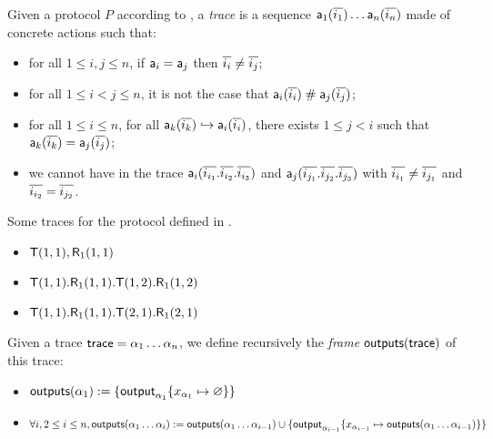 \begin{definition}
  Given a protocol $P$ according to , a \emph{trace} is a sequence $\textsf{a}_1(\overline{i_1}) \dots \textsf{a}_n(\overline{i_n})$ made of concrete actions such that:
  \begin{itemize}
    \item for all $1 \leq i,j \leq n$, if $\textsf{a}_i = \textsf{a}_j$ then $\overline{i_i} \neq \overline{i_j}$;
    \item for all $1 \leq i < j \leq n$, it is not the case that $\textsf{a}_i(\overline{i_i}) \mathrel{\#} \textsf{a}_j(\overline{i_j})$;
    \item for all $1 \leq i \leq n$, for all $\textsf{a}_k(\overline{i_k}) \hookrightarrow \textsf{a}_i(\overline{i_i})$, there exists $1 \leq j < i$ such that $\textsf{a}_k(\overline{i_k}) = \textsf{a}_j(\overline{i_j})$;
    \item we cannot have in the trace $\textsf{a}_i(\overline{i_{i_1}}.\overline{i_{i_2}}.\overline{i_{i_3}})$ and $\textsf{a}_j(\overline{i_{j_1}}.\overline{i_{j_2}}.\overline{i_{j_3}})$
    with $\overline{i_{i_1}} \neq \overline{i_{j_1}}$ and $\overline{i_{i_2}} = \overline{i_{j_2}}$.
  \end{itemize}
\end{definition}

\begin{example}
  \label{ex:basic-hash-trace}
  Some traces for the protocol defined in .
  \begin{itemize}
    \item $\textsf{T}(1,1),\textsf{R}_1(1,1)$
    \item $\textsf{T}(1,1).\textsf{R}_1(1,1).\textsf{T}(1,2).\textsf{R}_1(1,2)$
    \item $\textsf{T}(1,1).\textsf{R}_1(1,1).\textsf{T}(2,1).\textsf{R}_1(2,1)$
  \end{itemize}
\end{example}

\begin{definition}
  Given a trace $\textsf{trace} = \alpha_1 \dots \alpha_n$, we define recursively the \emph{frame} $\textsf{outputs}(\textsf{trace})$ of this trace:
  \begin{itemize}
    \item $\textsf{outputs}(\alpha_1) := \{ \textsf{output}_{\alpha_1}\{x_{\alpha_1} \mapsto \varnothing\} \}$
    \item $\forall i, 2 \leq i \leq n, \textsf{outputs}(\alpha_1 \dots \alpha_i) := \textsf{outputs}(\alpha_1 \dots \alpha_{i-1}) \cup \{ \textsf{output}_{\alpha_{i-1}}\{x_{\alpha_{i-1}} \mapsto \textsf{outputs}(\alpha_1 \dots \alpha_{i-1})\} \}$
  \end{itemize}
\end{definition}

